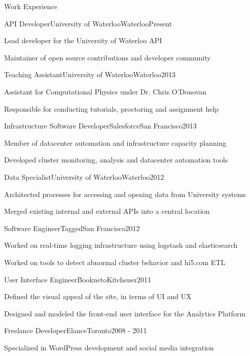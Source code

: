 \documentclass[oneside]{resume}
\begin{document}
  \begin{rSection}{Work Experience}

    \begin{rSubsection}{API Developer}{University of Waterloo}{Waterloo}{Present}
      \item Lead developer for the University of Waterloo API
      \item Maintainer of open source contributions and developer community
    \end{rSubsection}

    \begin{rSubsection}{Teaching Assistant}{University of Waterloo}{Waterloo}{2013}
      \item Assistant for Computational Physics under Dr. Chris O'Donovan
      \item Responsible for conducting tutorials, proctoring and assignment help
    \end{rSubsection}

    \begin{rSubsection}{Infrastructure Software Developer}{Salesforce}{San Francisco}{2013}
      \item Member of datacenter automation and infrastructure capacity planning
      \item Developed cluster monitoring, analysis and datacenter automation tools
    \end{rSubsection}

    \begin{rSubsection}{Data Specialist}{University of Waterloo}{Waterloo}{2012}
      \item Architected processes for accessing and opening data from University systems
      \item Merged existing internal and external APIs into a central location
    \end{rSubsection}

    \begin{rSubsection}{Software Engineer}{Tagged}{San Francisco}{2012}
      \item Worked on real-time logging infrastructure using logstash and elasticsearch
      \item Worked on tools to detect abnormal cluster behavior and hi5.com ETL
    \end{rSubsection}

    \begin{rSubsection}{User Interface Engineer}{Bookneto}{Kitchener}{2011}
      \item Defined the visual appeal of the site, in terms of UI and UX
      \item Designed and modeled the front-end user interface for the Analytics Platform
    \end{rSubsection}

    \begin{rSubsection}{Freelance Developer}{Elance}{Toronto}{2008 - 2011}
      \item Specialized in WordPress development and social media integration
    \end{rSubsection}

  \end{rSection}
\end{document}

